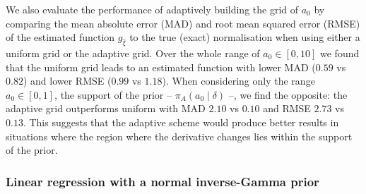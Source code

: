 \documentclass[a4paper, notitlepage, 11pt]{article}
\begin{document}
We also evaluate the performance of adaptively building the grid of $a_0$ by comparing the mean absolute error (MAD) and root mean squared error (RMSE) of the estimated function $g_{\hat{\xi}}$ to the true (exact) normalisation when using either a uniform grid or the adaptive grid.
Over the whole range of $a_0 \in [0, 10]$ we found that the uniform grid leads to an estimated function with lower MAD ($0.59$ vs $0.82$) and lower RMSE ($0.99$ vs $1.18$). 
When considering only the range $a_0 \in [0, 1]$, the support of the prior -- $\pi_A(a_0\mid \delta)$ --,  we find the opposite: the adaptive grid outperforms uniform with MAD $2.10$ vs $0.10$ and RMSE $2.73$ vs $0.13$.
This suggests that the adaptive scheme would produce better results in situations where the region where the derivative changes lies within the support of the prior.

\subsubsection{Linear regression with a normal inverse-Gamma prior}
\label{sec:linreg_ex}
\end{document}
